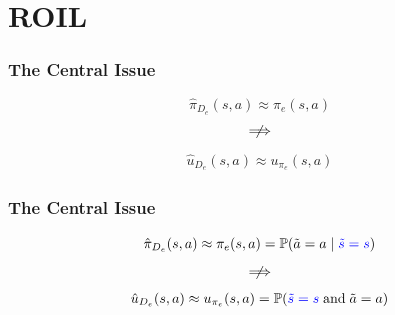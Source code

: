 \documentclass{beamer}
\begin{document}


\section*{ROIL}

\begin{frame}
\frametitle{The Central Issue}
\[
	\hat{\pi}_{D_e}(s, a) \approx \pi_e(s, a)
\]
\vfill
\[
	\centernot\implies
\]
\vfill
\begin{align*}
	\hat{u}_{D_e}(s, a) \approx u_{\pi_e}(s, a)
\end{align*}
\end{frame}

\begin{frame}
\frametitle{The Central Issue}
\[
	\hat{\pi}_{D_e}(s, a) \approx \pi_e(s, a) = \mathbb{P}(\tilde{a} = a \mid \textcolor{blue}{\tilde{s} = s})
\]
\vfill
\[
	\centernot\implies
\]
\vfill
\begin{align*}
	\hat{u}_{D_e}(s,a) \approx u_{\pi_e}(s,a) = \mathbb{P}(\textcolor{blue}{\tilde{s} = s} \;\text{and}\; \tilde{a} = a)
\end{align*}
\end{frame}
\end{document}
